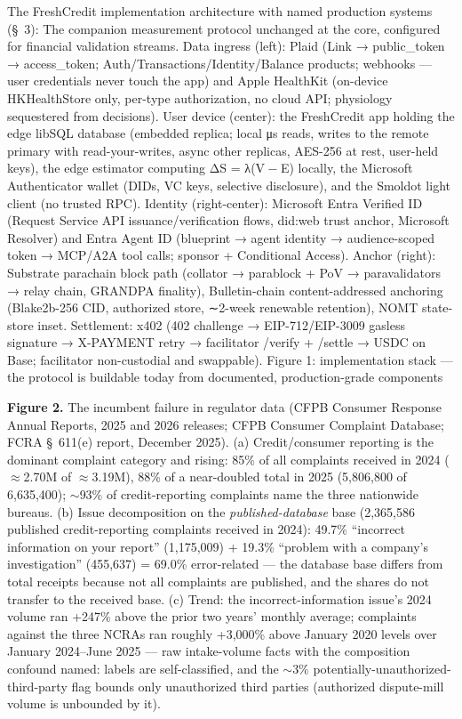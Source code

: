 \documentclass[
]{article}
\begin{document}
The FreshCredit implementation architecture with named production
systems (§~3): The companion measurement protocol unchanged at the core,
configured for financial validation streams. Data ingress (left): Plaid
(Link {→} public\_token {→} access\_token;
Auth/Transactions/Identity/Balance products; webhooks --- user
credentials never touch the app) and Apple HealthKit (on-device
HKHealthStore only, per-type authorization, no cloud API; physiology
sequestered from decisions). User device (center): the FreshCredit app
holding the edge libSQL database (embedded replica; local {μ}s reads,
writes to the remote primary with read-your-writes, async other
replicas, AES-256 at rest, user-held keys), the edge estimator computing
{ΔS = λ(V − E)} locally, the Microsoft Authenticator wallet (DIDs, VC
keys, selective disclosure), and the Smoldot light client (no trusted
RPC). Identity (right-center): Microsoft Entra Verified ID (Request
Service API issuance/verification flows, did:web trust anchor, Microsoft
Resolver) and Entra Agent ID (blueprint {→} agent identity {→}
audience-scoped token {→} MCP/A2A tool calls; sponsor + Conditional
Access). Anchor (right): Substrate parachain block path (collator {→}
parablock + PoV {→} paravalidators {→} relay chain, GRANDPA finality),
Bulletin-chain content-addressed anchoring (Blake2b-256 CID, authorized
store, {∼}2-week renewable retention), NOMT state-store inset.
Settlement: x402 (402 challenge {→} EIP-712/EIP-3009 gasless signature
{→} X-PAYMENT retry {→} facilitator /verify + /settle {→} USDC on Base;
facilitator non-custodial and swappable). Figure 1: implementation stack
--- the protocol is buildable today from documented, production-grade
components

\textbf{Figure 2.} The incumbent failure in regulator data (CFPB
Consumer Response Annual Reports, 2025 and 2026 releases; CFPB Consumer
Complaint Database; FCRA §~611(e) report, December 2025). (a)
Credit/consumer reporting is the dominant complaint category and rising:
85\% of all complaints received in 2024 (\(\approx\)2.70M of
\(\approx\)3.19M), 88\% of a near-doubled total in 2025 (5,806,800 of
6,635,400); \(\sim\)93\% of credit-reporting complaints name the three
nationwide bureaus. (b) Issue decomposition on the
\emph{published-database} base (2,365,586 published credit-reporting
complaints received in 2024): 49.7\% ``incorrect information on your
report'' (1,175,009) + 19.3\% ``problem with a company's investigation''
(455,637) = 69.0\% error-related --- the database base differs from
total receipts because not all complaints are published, and the shares
do not transfer to the received base. (c) Trend: the
incorrect-information issue's 2024 volume ran +247\% above the prior two
years' monthly average; complaints against the three NCRAs ran roughly
+3,000\% above January 2020 levels over January 2024--June 2025 --- raw
intake-volume facts with the composition confound named: labels are
self-classified, and the \(\sim\)3\%
potentially-unauthorized-third-party flag bounds only unauthorized third
parties (authorized dispute-mill volume is unbounded by it).
\end{document}
